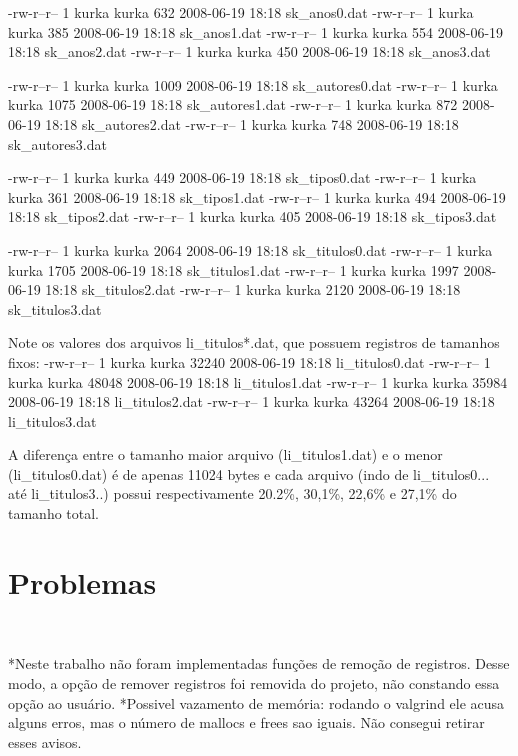 \documentclass{article}
\begin{document}
-rw-r--r-- 1 kurka kurka    632 2008-06-19 18:18 sk_anos0.dat
-rw-r--r-- 1 kurka kurka    385 2008-06-19 18:18 sk_anos1.dat
-rw-r--r-- 1 kurka kurka    554 2008-06-19 18:18 sk_anos2.dat
-rw-r--r-- 1 kurka kurka    450 2008-06-19 18:18 sk_anos3.dat

-rw-r--r-- 1 kurka kurka   1009 2008-06-19 18:18 sk_autores0.dat
-rw-r--r-- 1 kurka kurka   1075 2008-06-19 18:18 sk_autores1.dat
-rw-r--r-- 1 kurka kurka    872 2008-06-19 18:18 sk_autores2.dat
-rw-r--r-- 1 kurka kurka    748 2008-06-19 18:18 sk_autores3.dat

-rw-r--r-- 1 kurka kurka    449 2008-06-19 18:18 sk_tipos0.dat
-rw-r--r-- 1 kurka kurka    361 2008-06-19 18:18 sk_tipos1.dat
-rw-r--r-- 1 kurka kurka    494 2008-06-19 18:18 sk_tipos2.dat
-rw-r--r-- 1 kurka kurka    405 2008-06-19 18:18 sk_tipos3.dat

-rw-r--r-- 1 kurka kurka   2064 2008-06-19 18:18 sk_titulos0.dat
-rw-r--r-- 1 kurka kurka   1705 2008-06-19 18:18 sk_titulos1.dat
-rw-r--r-- 1 kurka kurka   1997 2008-06-19 18:18 sk_titulos2.dat
-rw-r--r-- 1 kurka kurka   2120 2008-06-19 18:18 sk_titulos3.dat

Note os valores dos arquivos li_titulos*.dat, que possuem registros de tamanhos fixos:
-rw-r--r-- 1 kurka kurka  32240 2008-06-19 18:18 li_titulos0.dat
-rw-r--r-- 1 kurka kurka  48048 2008-06-19 18:18 li_titulos1.dat
-rw-r--r-- 1 kurka kurka  35984 2008-06-19 18:18 li_titulos2.dat
-rw-r--r-- 1 kurka kurka  43264 2008-06-19 18:18 li_titulos3.dat

A diferença entre o tamanho maior arquivo (li_titulos1.dat) e o menor (li_titulos0.dat) é de apenas 11024 bytes e cada arquivo (indo de li_titulos0... até li_titulos3..) possui respectivamente 20.2\%, 30,1\%, 22,6\% e 27,1\% do tamanho total.


\section{Problemas}\

*Neste trabalho não foram implementadas funções de remoção de registros. Desse modo, a opção de remover registros foi removida do projeto, não constando essa opção ao usuário.
*Possivel vazamento de memória: rodando o valgrind ele acusa alguns erros, mas o número de mallocs e frees sao iguais. Não consegui retirar esses avisos.
\end{document}
